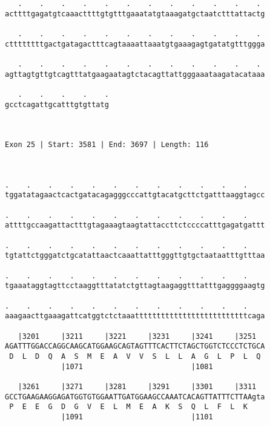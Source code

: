 \documentclass{article}
\begin{document}
\begin{Verbatim}
   .    .    .    .    .    .    .    .    .    .    .    . 
acttttgagatgtcaaacttttgtgtttgaaatatgtaaagatgctaatctttattactg
                                                            
   .    .    .    .    .    .    .    .    .    .    .    . 
cttttttttgactgatagactttcagtaaaattaaatgtgaaagagtgatatgtttggga
                                                            
   .    .    .    .    .    .    .    .    .    .    .    . 
agttagtgttgtcagtttatgaagaatagtctacagttattgggaaataagatacataaa
                                                            
   .    .    .    .    .
gcctcagattgcatttgtgttatg
                        
                        
 
Exon 25 | Start: 3581 | End: 3697 | Length: 116



.    .    .    .    .    .    .    .    .    .    .    .    
tggatatagaactcactgatacagagggcccattgtacatgcttctgatttaaggtagcc
                                                            
.    .    .    .    .    .    .    .    .    .    .    .    
attttgccaagattactttgtagaaagtaagtattaccttctccccatttgagatgattt
                                                            
.    .    .    .    .    .    .    .    .    .    .    .    
tgtattctgggatctgcatattaactcaaattatttgggttgtgctaataatttgtttaa
                                                            
.    .    .    .    .    .    .    .    .    .    .    .    
tgaaataggtagttcctaaggtttatatctgttagtaagaggtttatttgaggggaagtg
                                                            
.    .    .    .    .    .    .    .    .    .    .    .    
aaagaacttgaaagattcatggtctctaaattttttttttttttttttttttttttcaga
                                                            
   |3201     |3211     |3221     |3231     |3241     |3251  
AGATTTGGACCAGGCAAGCATGGAAGCAGTAGTTTCACTTCTAGCTGGTCTCCCTCTGCA
 D  L  D  Q  A  S  M  E  A  V  V  S  L  L  A  G  L  P  L  Q 
             |1071                         |1081            
  
   |3261     |3271     |3281     |3291     |3301     |3311  
GCCTGAAGAAGGAGATGGTGTGGAATTGATGGAAGCCAAATCACAGTTATTTCTTAAgta
 P  E  E  G  D  G  V  E  L  M  E  A  K  S  Q  L  F  L  K    
             |1091                         |1101            
  

\end{Verbatim}
\end{document}
